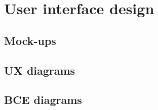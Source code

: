 \section{User interface design}
\label{sect:userinterfacedesign}

\subsection{Mock-ups}
\label{subsect:mockups}

\subsection{UX diagrams}
\label{subsect:userexpirience}

\subsection{BCE diagrams}
\label{subsect:BCEdiagrams}